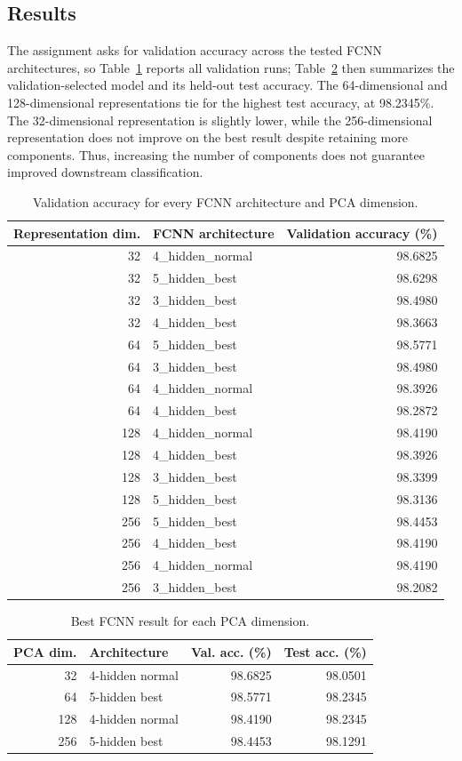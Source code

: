 \documentclass[conference,onecolumn]{IEEEtran}
\begin{document}
\subsection{Results}
The assignment asks for validation accuracy across the tested FCNN architectures, so Table~\ref{tab:pca-all-val} reports all validation runs; Table~\ref{tab:pca-results} then summarizes the validation-selected model and its held-out test accuracy. The 64-dimensional and 128-dimensional representations tie for the highest test accuracy, at 98.2345\%. The 32-dimensional representation is slightly lower, while the 256-dimensional representation does not improve on the best result despite retaining more components. Thus, increasing the number of components does not guarantee improved downstream classification.

\begin{table}[H]
\centering
\small
\caption{ Validation accuracy for every FCNN architecture and PCA dimension.}
\label{tab:pca-all-val}
\begin{tabular}{r l r}
\toprule
Representation dim. & FCNN architecture & Validation accuracy (\%)\\
\midrule
32 & 4\_hidden\_normal & 98.6825 \\
32 & 5\_hidden\_best & 98.6298 \\
32 & 3\_hidden\_best & 98.4980 \\
32 & 4\_hidden\_best & 98.3663 \\
64 & 5\_hidden\_best & 98.5771 \\
64 & 3\_hidden\_best & 98.4980 \\
64 & 4\_hidden\_normal & 98.3926 \\
64 & 4\_hidden\_best & 98.2872 \\
128 & 4\_hidden\_normal & 98.4190 \\
128 & 4\_hidden\_best & 98.3926 \\
128 & 3\_hidden\_best & 98.3399 \\
128 & 5\_hidden\_best & 98.3136 \\
256 & 5\_hidden\_best & 98.4453 \\
256 & 4\_hidden\_best & 98.4190 \\
256 & 4\_hidden\_normal & 98.4190 \\
256 & 3\_hidden\_best & 98.2082 \\
\bottomrule
\end{tabular}
\end{table}

\begin{table}[H]
\centering
\small
\caption{ Best FCNN result for each PCA dimension.}
\label{tab:pca-results}
\begin{tabular}{r l r r}
\toprule
PCA dim. & Architecture & Val. acc. (\%) & Test acc. (\%)\\
\midrule
32 & 4-hidden normal & 98.6825 & 98.0501\\
64 & 5-hidden best & 98.5771 & 98.2345\\
128 & 4-hidden normal & 98.4190 & 98.2345\\
256 & 5-hidden best & 98.4453 & 98.1291\\
\bottomrule
\end{tabular}
\end{table}
\end{document}
